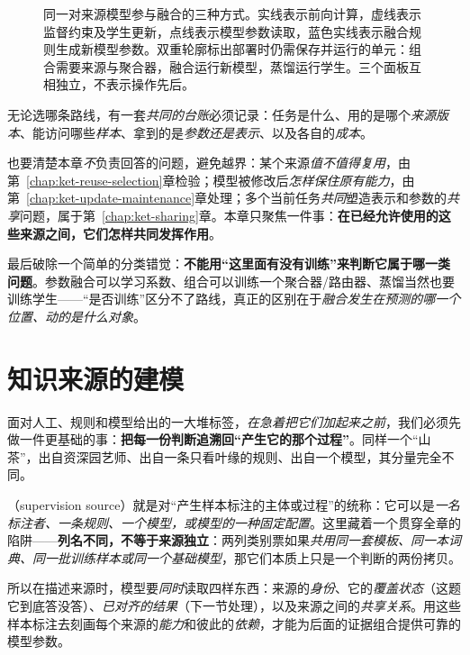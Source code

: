 \begin{figure}[htbp]
  \centering
  
  \caption{同一对来源模型参与融合的三种方式。实线表示前向计算，虚线表示监督约束及学生更新，点线表示模型参数读取，蓝色实线表示融合规则生成新模型参数。双重轮廓标出部署时仍需保存并运行的单元：组合需要来源与聚合器，融合运行新模型，蒸馏运行学生。三个面板互相独立，不表示操作先后。}
  \label{fig:ket-integration-routes}
\end{figure}

无论选哪条路线，有一套\emph{共同的台账}必须记录：任务是什么、用的是哪个\emph{来源版本}、能访问哪些\emph{样本}、拿到的是\emph{参数还是表示}、以及各自的\emph{成本}。

也要清楚本章\emph{不}负责回答的问题，避免越界：某个来源\emph{值不值得复用}，由第~\ref{chap:ket-reuse-selection}章检验；模型被修改后\emph{怎样保住原有能力}，由第~\ref{chap:ket-update-maintenance}章处理；多个当前任务\emph{共同}塑造表示和参数的\emph{共享}问题，属于第~\ref{chap:ket-sharing}章。本章只聚焦一件事：\textbf{在已经允许使用的这些来源之间，它们怎样共同发挥作用}。

最后破除一个简单的分类错觉：\textbf{不能用“这里面有没有训练”来判断它属于哪一类问题}。参数融合可以学习系数、组合可以训练一个聚合器/路由器、蒸馏当然也要训练学生——“是否训练”区分不了路线，真正的区别在于\emph{融合发生在预测的哪一个位置、动的是什么对象}。

\section{知识来源的建模}
\label{sec:knowledge-fusion-source-modeling}

面对人工、规则和模型给出的一大堆标签，\emph{在急着把它们加起来之前}，我们必须先做一件更基础的事：\textbf{把每一份判断追溯回“产生它的那个过程”}。同样一个“山茶”，出自资深园艺师、出自一条只看叶缘的规则、出自一个模型，其分量完全不同。

（supervision source）就是对“产生样本标注的主体或过程”的统称：它可以是\emph{一名标注者、一条规则、一个模型，或模型的一种固定配置}。这里藏着一个贯穿全章的陷阱——\textbf{列名不同，不等于来源独立}：两列类别票如果\emph{共用同一套模板、同一本词典、同一批训练样本或同一个基础模型}，那它们本质上只是一个判断的两份拷贝。

所以在描述来源时，模型要\emph{同时}读取四样东西：来源的\emph{身份}、它的\emph{覆盖状态}（这题它到底答没答）、\emph{已对齐的结果}（下一节处理），以及来源之间的\emph{共享关系}。用这些样本标注去刻画每个来源的\emph{能力}和彼此的\emph{依赖}，才能为后面的证据组合提供可靠的模型参数。


